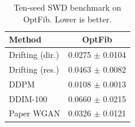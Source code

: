 \begin{table}[t]
\centering
\caption{Ten-seed SWD benchmark on OptFib. Lower is better.}
\label{tab:benchmark-optfib}
\begin{tabular}{lc}
\hline
Method & OptFib \\
\hline
Drifting (dir.) & 0.0275 $\pm$ 0.0104 \\
Drifting (res.) & 0.0463 $\pm$ 0.0082 \\
DDPM & 0.0108 $\pm$ 0.0013 \\
DDIM-100 & 0.0660 $\pm$ 0.0215 \\
Paper WGAN & 0.0326 $\pm$ 0.0121 \\
\hline
\end{tabular}
\end{table}
